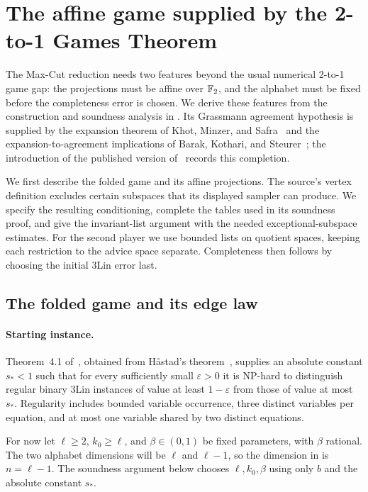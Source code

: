\section{The affine game supplied by the 2-to-1 Games Theorem}
\label{sec:affine-games}

The Max-Cut reduction needs two features beyond the usual numerical
2-to-1 game gap: the projections must be affine over $\mathbb F_2$, and the
alphabet must be fixed before the completeness error is chosen.
We derive these features from the construction and soundness analysis in
\cite[Sections~4--5]{DKKMS25}.  Its Grassmann agreement hypothesis is
supplied by the expansion theorem of Khot, Minzer, and Safra~\cite{KMS23}
and the expansion-to-agreement implications of Barak, Kothari, and
Steurer~\cite[Theorems~9--11]{BKS19}; the introduction of the published
version of~\cite{DKKMS25} records this completion.

We first describe the folded game and its affine projections.  The
source's vertex definition excludes certain subspaces that its displayed
sampler can produce.  We specify the resulting conditioning, complete the
tables used in its soundness proof, and give the invariant-list argument
with the needed exceptional-subspace estimates.  For the second player
we use bounded lists on quotient spaces, keeping each restriction to
the advice space separate.  Completeness then follows by choosing the
initial 3Lin error last.

\subsection{The folded game and its edge law}

\paragraph{Starting instance.}
Theorem~4.1 of~\cite{DKKMS25}, obtained from H\aa stad's
theorem~\cite{Hastad01}, supplies an absolute constant $s_*<1$ such that
for every sufficiently small $\varepsilon>0$ it is NP-hard to distinguish regular binary
3Lin instances of value at least $1-\varepsilon$ from those of value at
most $s_*$.  Regularity includes bounded variable occurrence, three
distinct variables per equation, and at most one variable shared by two
distinct equations.

For now let $\ell\ge2$, $k_0\ge\ell$, and $\beta\in(0,1)$ be fixed
parameters, with $\beta$ rational.  The two alphabet dimensions will be
$\ell$ and $\ell-1$, so the dimension in  is
$n=\ell-1$.  The soundness argument below chooses $\ell,k_0,\beta$
using only $b$ and the absolute constant $s_*$.

